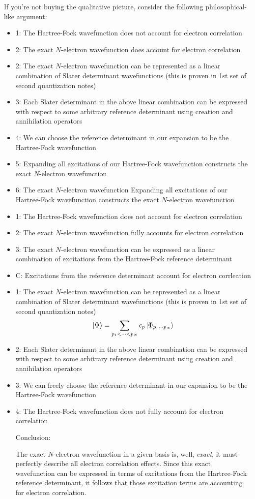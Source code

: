 \documentclass{article}
\begin{document}
If you're not buying the qualitative picture, consider the following philosophical-like argument:
\begin{itemize}
\item 1: The Hartree-Fock wavefunction does not account for electron correlation
\item 2: The exact $N$-electron wavefunction does account for electron correlation 
\item 2: The exact $N$-electron wavefunction can be represented as a linear combination of Slater determinant wavefunctions (this is proven in 1st set of second quantization notes)
\item 3: Each Slater determinant in the above linear combination can be expressed with respect to some arbitrary reference determinant using creation and annihilation operators
\item 4: We can choose the reference determinant in our expansion to be the Hartree-Fock wavefunction 
\item 5: Expanding all excitations of our Hartree-Fock wavefunction constructs the exact $N$-electron wavefunction 
\item 6: The exact $N$-electron wavefunction  Expanding all excitations of our Hartree-Fock wavefunction constructs the exact $N$-electron wavefunction 


\item 1: The Hartree-Fock wavefunction does not account for electron correlation
\item 2: The exact $N$-electron wavefunction fully accounts for electron correlation
\item 3: The exact $N$-electron wavefunction can be expressed as a linear combination of excitations from the Hartree-Fock reference determinant 
\item C: Excitations from the reference determinant account for electron corrleation


\item 1: The exact $N$-electron wavefunction can be represented as a linear combination of Slater determinant wavefunctions (this is proven in 1st set of second quantization notes)
\[ \ket{\Psi} = \sum_{p_1 < \cdots < p_N} c_p \ket{\Phi_{p_1 \cdots p_N}} \]
\item 2: Each Slater determinant in the above linear combination can be expressed with respect to some arbitrary reference determinant using creation and annihilation operators
\item 3: We can freely choose the reference determinant in our expansion to be the Hartree-Fock wavefunction 
\item 4: The Hartree-Fock wavefunction does not fully account for electron correlation

Conclusion: 

The exact $N$-electron wavefunction in a given basis is, well, \textit{exact}, it must perfectly describe all electron correlation effects.
Since this exact wavefunction can be expressed in terms of excitations from the Hartree-Fock reference determinant, it follows that those excitation terms are accounting for electron correlation.

\end{itemize}
\end{document}
